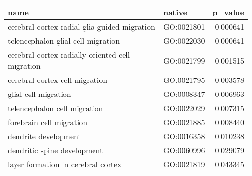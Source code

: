 \begin{tabular}{llr}
\toprule
name & native & p_value \\
\midrule
cerebral cortex radial glia-guided migration & GO:0021801 & 0.000641 \\
telencephalon glial cell migration & GO:0022030 & 0.000641 \\
cerebral cortex radially oriented cell migration & GO:0021799 & 0.001515 \\
cerebral cortex cell migration & GO:0021795 & 0.003578 \\
glial cell migration & GO:0008347 & 0.006963 \\
telencephalon cell migration & GO:0022029 & 0.007315 \\
forebrain cell migration & GO:0021885 & 0.008440 \\
dendrite development & GO:0016358 & 0.010238 \\
dendritic spine development & GO:0060996 & 0.029079 \\
layer formation in cerebral cortex & GO:0021819 & 0.043345 \\
\bottomrule
\end{tabular}
